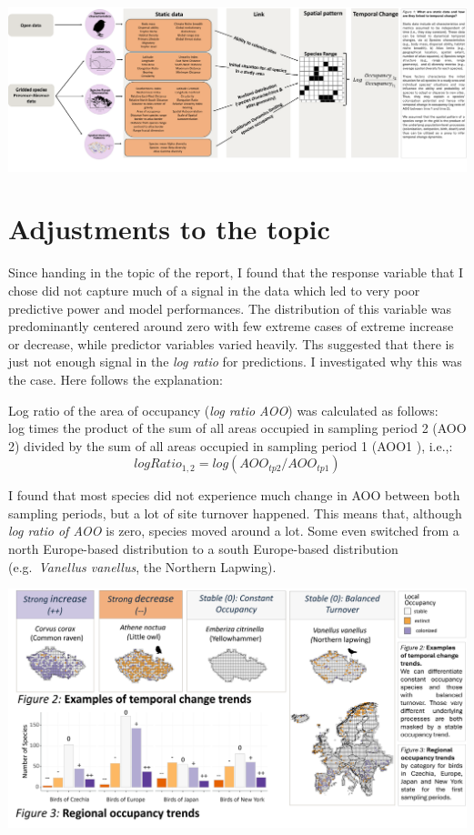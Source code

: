 \documentclass[
  letterpaper,
  DIV=11,
  numbers=noendperiod]{scrreprt}
\begin{document}
\includegraphics{_img/VisualAbstract1_good.png}

\section*{Adjustments to the topic}\label{adjustments-to-the-topic}


Since handing in the topic of the report, I found that the response
variable that I chose did not capture much of a signal in the data which
led to very poor predictive power and model performances. The
distribution of this variable was predominantly centered around zero
with few extreme cases of extreme increase or decrease, while predictor
variables varied heavily. Ths suggested that there is just not enough
signal in the \emph{log ratio} for predictions. I investigated why this
was the case. Here follows the explanation:

Log ratio of the area of occupancy (\emph{log ratio AOO}) was calculated
as follows:\\
log times the product of the sum of all areas occupied in sampling
period 2 (AOO 2) divided by the sum of all areas occupied in sampling
period 1 (AOO1 ), i.e.,:\\
\[log Ratio_{1,2} = log(AOO_{tp2}/AOO_{tp1})\]

I found that most species did not experience much change in AOO between
both sampling periods, but a lot of site turnover happened. This means
that, although \emph{log ratio of AOO} is zero, species moved around a
lot. Some even switched from a north Europe-based distribution to a
south Europe-based distribution (e.g.~\emph{Vanellus vanellus}, the
Northern Lapwing).

\includegraphics{_img/ChangeMaps2.png}
\end{document}
